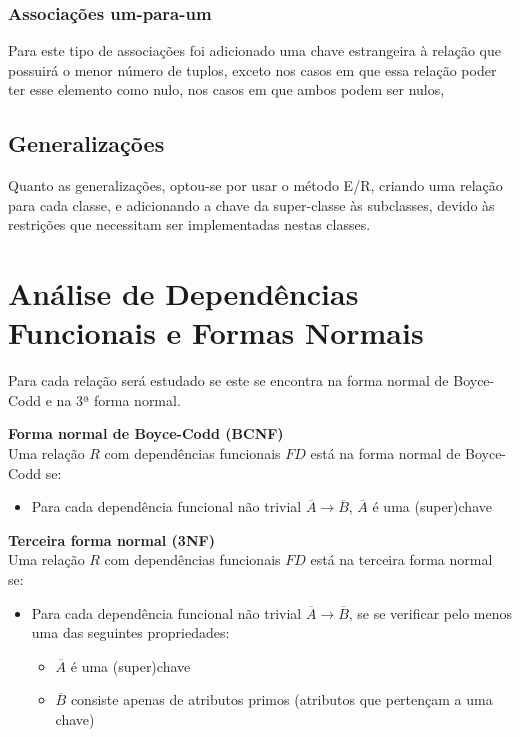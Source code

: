 \documentclass[article, a4paper, 12pt, oneside]{memoir}
\begin{document}
\subsection{Associações um-para-um}
Para este tipo de associações foi adicionado uma chave estrangeira à relação que possuirá o menor número de tuplos, exceto nos casos em que essa relação poder ter esse elemento como nulo, nos casos em que ambos podem ser nulos,

\section{Generalizações}
Quanto as generalizações, optou-se por usar o método E/R, criando uma relação para cada classe, e adicionando a chave da super-classe às subclasses, devido às restrições que necessitam ser implementadas nestas classes.

\newpage
\chapter[Análise de DFs e FNs][Análise de FDs e FNs]{Análise de Dependências Funcionais e Formas Normais} \label{\thechapter}

Para cada relação será estudado se este se encontra na forma normal de Boyce-Codd e na 3ª forma normal.

\textbf{Forma normal de Boyce-Codd (BCNF)}\\
Uma relação $R$ com dependências funcionais $FD$ está na forma normal de Boyce-Codd se:
\begin{itemize}
	\item Para cada dependência funcional não trivial $\overline{A}\rightarrow\overline{B}$, $\overline{A}$ é uma (super)chave
\end{itemize}

\textbf{Terceira forma normal (3NF)}\\
Uma relação $R$ com dependências funcionais $FD$ está na terceira forma normal se:
\begin{itemize}
	\item Para cada dependência funcional não trivial $\overline{A}\rightarrow\overline{B}$, se se verificar pelo menos uma das seguintes propriedades:
	\begin{itemize}
		\item $\overline{A}$ é uma (super)chave
		\item $\overline{B}$ consiste apenas de atributos primos (atributos que pertençam a uma chave)
	\end{itemize}
\end{itemize}
\end{document}
